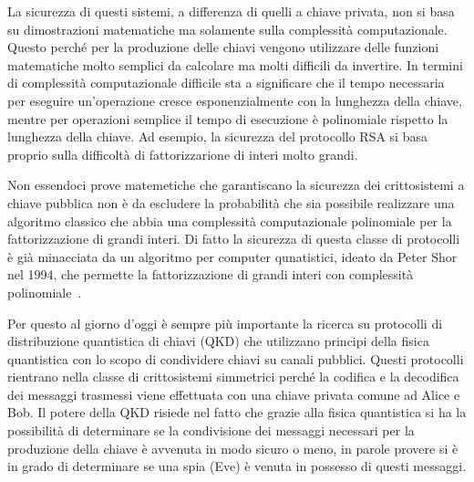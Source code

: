 La sicurezza di questi sistemi, a differenza di quelli a chiave privata, non si basa su dimostrazioni matematiche ma solamente sulla complessit\`a computazionale. Questo perch\'e per la produzione delle chiavi vengono utilizzare delle funzioni matematiche molto semplici da calcolare ma molti difficili da invertire. In termini di complessit\`a computazionale difficile sta a significare che il tempo necessaria per eseguire un'operazione cresce esponenzialmente con la lunghezza della chiave, mentre per operazioni semplice il tempo di esecuzione \`e polinomiale rispetto la lunghezza della chiave. Ad esempio, la sicurezza del protocollo RSA si basa proprio sulla difficolt\`a di fattorizzarione di interi molto grandi.

Non essendoci prove matemetiche che garantiscano la sicurezza dei crittosistemi a chiave pubblica non \`e da escludere la probabilit\`a che sia possibile realizzare una algoritmo classico che abbia una complessit\`a computazionale polinomiale per la fattorizzazione di grandi interi. Di fatto la sicurezza di questa classe di protocolli \`e gi\`a minacciata da un algoritmo per computer qunatistici, ideato da Peter Shor nel 1994, che permette la fattorizzazione di grandi interi con complessit\`a polinomiale~\cite{365700}.

Per questo al giorno d'oggi \`e sempre pi\`u importante la ricerca su protocolli di distribuzione quantistica di chiavi (QKD) che utilizzano principi della fisica quantistica con lo scopo di condividere chiavi su canali pubblici. Questi protocolli rientrano nella classe di crittosistemi simmetrici perch\'e la codifica e la decodifica dei messaggi trasmessi viene effettuata con una chiave privata comune ad Alice e Bob. Il potere della QKD risiede nel fatto che grazie alla fisica quantistica si ha la possibilit\`a di determinare se la condivisione dei messaggi necessari per la produzione della chiave \`e avvenuta in modo sicuro o meno, in parole provere si \`e in grado di determinare se una spia (Eve) \`e venuta in possesso di questi messaggi.

